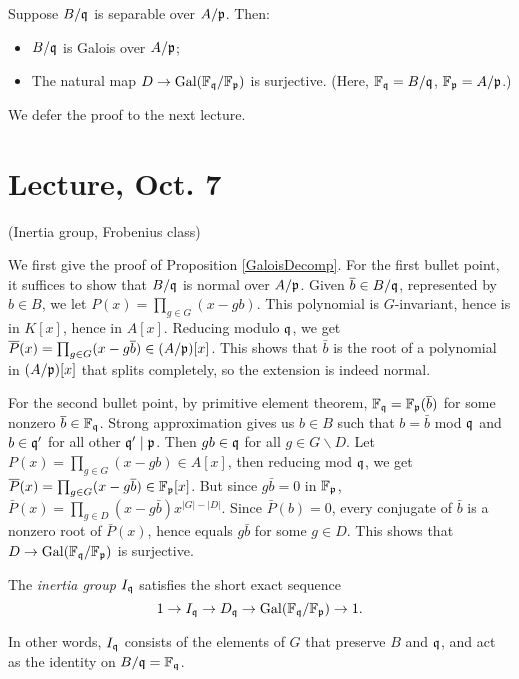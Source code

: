 \documentclass[11pt]{amsart}
\begin{document}
\begin{prop}
\label{GaloisDecomp}
Suppose $B/\mathfrak{q}$ is separable over $A/\mathfrak{p}$. Then:
\begin{itemize}
    \item $B/\mathfrak{q}$ is Galois over $A/\mathfrak{p}$;
    \item The natural map $D\to \operatorname{Gal}(\mathbb{F}_{\mathfrak{q}}/\mathbb{F}_{\mathfrak{p}})$ is surjective. (Here, $\mathbb{F}_{\mathfrak{q}} = B/\mathfrak{q}$, $\mathbb{F}_{\mathfrak{p}} = A/\mathfrak{p}$.)
\end{itemize}
\end{prop}

We defer the proof to the next lecture.

\section{Lecture, Oct. 7}

(Inertia group, Frobenius class)

We first give the proof of Proposition \ref{GaloisDecomp}. For the first bullet point, it suffices to show that $B/\mathfrak{q}$ is normal over $A/\mathfrak{p}$. Given $\overline{b}\in B/\mathfrak{q}$, represented by $b\in B$, we let $P(x) = \prod_{g\in G} (x-gb)$. This polynomial is $G$-invariant, hence is in $K[x]$, hence in $A[x]$. Reducing modulo $\mathfrak{q}$, we get $\overline{P}(x) = \prod_{g\in G} (x - g\overline{b}) \in (A/\mathfrak{p})[x]$. This shows that $\bar{b}$ is the root of a polynomial in $(A/\mathfrak{p})[x]$ that splits completely, so the extension is indeed normal.

For the second bullet point, by primitive element theorem, $\mathbb{F}_{\mathfrak{q}} = \mathbb{F}_{\mathfrak{p}}(\overline{b})$ for some nonzero $\overline{b}\in \mathbb{F}_{\mathfrak{q}}$. Strong approximation gives us $b\in B$ such that $b = \bar{b}$ mod $\mathfrak{q}$ and $b\in \mathfrak{q}'$ for all other $\mathfrak{q}'\mid \mathfrak{p}$. Then $gb\in \mathfrak{q}$ for all $g\in G\backslash D$. Let $P(x) = \prod_{g\in G}(x-gb) \in A[x]$, then reducing mod $\mathfrak{q}$, we get $\overline{P}(x) = \prod_{g\in G}(x - g\overline{b}) \in \mathbb{F}_{\mathfrak{p}}[x]$. But since $g\bar{b} = 0$ in $\mathbb{F}_{\mathfrak{p}}$, $\bar{P}(x) = \prod_{g\in D} (x - g\bar{b})x^{|G|-|D|}$. Since $\bar{P}(b) = 0$, every conjugate of $\bar{b}$ is a nonzero root of $\bar{P}(x)$, hence equals $g\bar{b}$ for some $g\in D$. This shows that $D\to \operatorname{Gal}(\mathbb{F}_{\mathfrak{q}}/\mathbb{F}_{\mathfrak{p}})$ is surjective.

\begin{defn}
The \emph{inertia group} $I_{\mathfrak{q}}$ satisfies the short exact sequence
\[1\to I_{\mathfrak{q}} \to D_{\mathfrak{q}} \to \operatorname{Gal}(\mathbb{F}_{\mathfrak{q}}/\mathbb{F}_{\mathfrak{p}}) \to 1.\]
\end{defn}

In other words, $I_{\mathfrak{q}}$ consists of the elements of $G$ that preserve $B$ and $\mathfrak{q}$, and act as the identity on $B/\mathfrak{q} = \mathbb{F}_{\mathfrak{q}}$.
\end{document}

